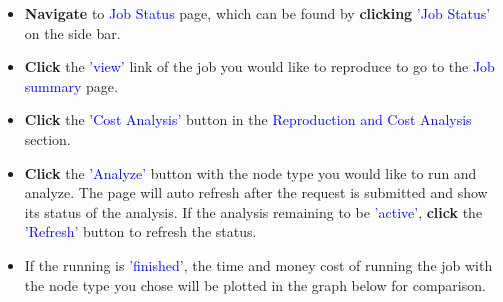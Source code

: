\begin{itemize}
\item \textbf{Navigate} to \textcolor{blue}{Job Status} page, which can be found by \textbf{clicking} \textcolor{blue}{'Job Status'} on the side bar.
\item \textbf{Click} the \textcolor{blue}{'view'} link of the job you would like to reproduce to go to the \textcolor{blue}{Job summary} page.
\item \textbf{Click} the \textcolor{blue}{'Cost Analysis'} button in the \textcolor{blue}{Reproduction and Cost Analysis} section.
\item \textbf{Click} the \textcolor{blue}{'Analyze'} button with the node type you would like to run and analyze. The page will auto refresh after the request is submitted and show its status of the analysis. If the analysis remaining to be \textcolor{blue}{'active'}, \textbf{click} the \textcolor{blue}{'Refresh'} button to refresh the status.
\item If the running is \textcolor{blue}{'finished'}, the time and money cost of running the job with the node type you chose will be plotted in the graph below for comparison.
\end{itemize}


